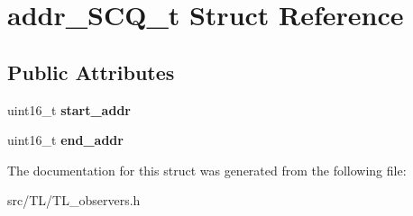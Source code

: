 \hypertarget{structaddr__SCQ__t}{}\section{addr\+\_\+\+S\+C\+Q\+\_\+t Struct Reference}
\label{structaddr__SCQ__t}
\subsection*{Public Attributes}
\begin{DoxyCompactItemize}
\item 
\mbox{\label{structaddr__SCQ__t_a97f766a46864b0a4cf3e5d8131d05718}} 
uint16\+\_\+t {\bfseries start\+\_\+addr}
\item 
\mbox{\label{structaddr__SCQ__t_afd199ac6679381b7591712db8914583d}} 
uint16\+\_\+t {\bfseries end\+\_\+addr}
\end{DoxyCompactItemize}


The documentation for this struct was generated from the following file\+:\begin{DoxyCompactItemize}
\item 
src/\+T\+L/T\+L\+\_\+observers.\+h\end{DoxyCompactItemize}
